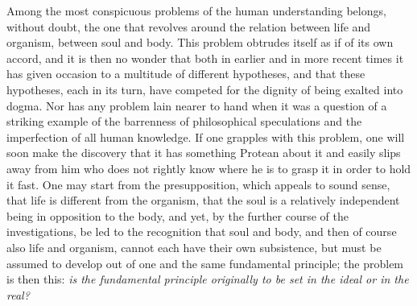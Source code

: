 \documentclass[12pt]{article}
\begin{document}
\noindent
Among the most conspicuous problems of the human understanding belongs,
without doubt, the one that revolves around the relation between life and
organism, between soul and body. This problem obtrudes itself as if of its
own accord, and it is then no wonder that both in earlier and in more recent
times it has given occasion to a multitude of different hypotheses, and that
these hypotheses, each in its turn, have competed for the dignity of being
exalted into dogma. Nor has any problem lain nearer to hand when it was a
question of a striking example of the barrenness of philosophical
speculations and the imperfection of all human
knowledge. If one grapples with this problem, one will soon make the
discovery that it has something Protean about it and easily slips away from
him who does not rightly know where he is to grasp it in order to hold it
fast. One may start from the presupposition, which appeals to sound sense,
that life is different from the organism, that the soul is a relatively
independent being in opposition to the body, and yet, by the further course
of the investigations, be led to the recognition that soul and body, and
then of course also life and organism, cannot each have their own
subsistence, but must be assumed to develop out of one and the same
fundamental principle; the problem is then this: \emph{is the fundamental
principle originally to be set in the ideal or in the real?}
\end{document}
